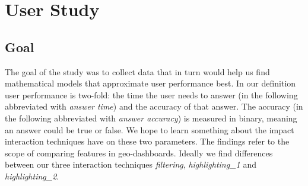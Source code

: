 \chapter{User Study}

\section{Goal}
The goal of the study was to collect data that in turn would help us find mathematical models that approximate user performance best. In our
definition user performance is two-fold: the time the user needs to answer (in the following abbreviated with \textit{answer time}) and the
accuracy of that answer. The accuracy (in the following abbreviated with \textit{answer accuracy}) is measured in binary, meaning an answer could
be true or false. We hope to learn something about the impact interaction techniques have on these two parameters. The findings refer to the scope
of comparing features in geo-dashboards. Ideally we find differences between our three interaction techniques \textit{filtering}, \textit{highlighting\_1}
and \textit{highlighting\_2}.

